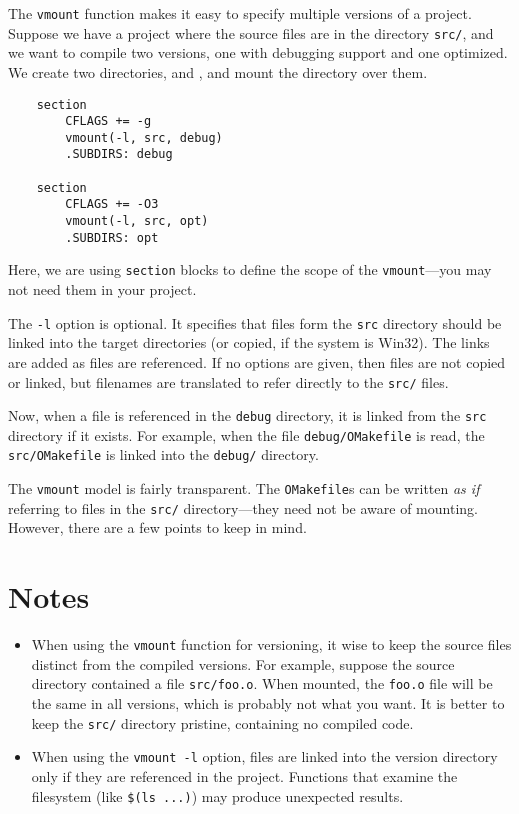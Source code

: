 The \verb+vmount+ function makes it easy to specify multiple versions of a project.  Suppose we have
a project where the source files are in the directory \verb+src/+, and we want to compile two
versions, one with debugging support and one optimized.  We create two directories,  and
, and mount the  directory over them.

\begin{verbatim}
    section
        CFLAGS += -g
        vmount(-l, src, debug)
        .SUBDIRS: debug

    section
        CFLAGS += -O3
        vmount(-l, src, opt)
        .SUBDIRS: opt
\end{verbatim}

Here, we are using \verb+section+ blocks to define the scope of the \verb+vmount+---you may not need
them in your project.

The \verb+-l+ option is optional.  It specifies that files form the \verb+src+ directory should be
linked into the target directories (or copied, if the system is Win32).  The links are added as
files are referenced.  If no options are given, then files are not copied or linked, but filenames
are translated to refer directly to the \verb+src/+ files.

Now, when a file is referenced in the \verb+debug+ directory, it is linked from the \verb+src+
directory if it exists.  For example, when the file \verb+debug/OMakefile+ is read, the
\verb+src/OMakefile+ is linked into the \verb+debug/+ directory.

The \verb+vmount+ model is fairly transparent.  The \verb+OMakefile+s can be written \emph{as if}
referring to files in the \verb+src/+ directory---they need not be aware of mounting.
However, there are a few points to keep in mind.

\section{Notes}

\begin{itemize}
\item When using the \verb+vmount+ function for versioning, it wise to keep the source files
distinct from the compiled versions.  For example, suppose the source directory contained a file
\verb+src/foo.o+.  When mounted, the \verb+foo.o+ file will be the same in all versions, which is
probably not what you want.  It is better to keep the \verb+src/+ directory pristine, containing no
compiled code.

\item When using the \verb+vmount -l+ option, files are linked into the version directory only if
they are referenced in the project.  Functions that examine the filesystem (like \verb+$(ls ...)+)
may produce unexpected results.
\end{itemize}

